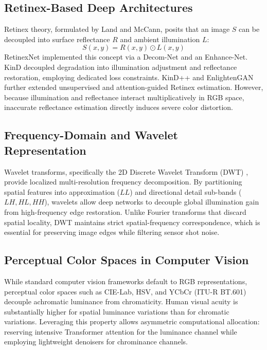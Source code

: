\documentclass[10pt,twocolumn,letterpaper]{article}
\begin{document}
\subsection{Retinex-Based Deep Architectures}
Retinex theory, formulated by Land and McCann, posits that an image $S$ can be decoupled into surface reflectance $R$ and ambient illumination $L$:
\begin{equation}
S(x, y) = R(x, y) \odot L(x, y)
\end{equation}
RetinexNet \cite{wei2018deep} implemented this concept via a Decom-Net and an Enhance-Net. KinD \cite{zhang2019kindling} decoupled degradation into illumination adjustment and reflectance restoration, employing dedicated loss constraints. KinD++ and EnlightenGAN \cite{jiang2021enlightengan} further extended unsupervised and attention-guided Retinex estimation. However, because illumination and reflectance interact multiplicatively in RGB space, inaccurate reflectance estimation directly induces severe color distortion.

\subsection{Frequency-Domain and Wavelet Representation}
Wavelet transforms, specifically the 2D Discrete Wavelet Transform (DWT) \cite{mallat1989theory}, provide localized multi-resolution frequency decomposition. By partitioning spatial features into approximation ($LL$) and directional detail sub-bands ($LH, HL, HH$), wavelets allow deep networks to decouple global illumination gain from high-frequency edge restoration. Unlike Fourier transforms that discard spatial locality, DWT maintains strict spatial-frequency correspondence, which is essential for preserving image edges while filtering sensor shot noise.

\subsection{Perceptual Color Spaces in Computer Vision}
While standard computer vision frameworks default to RGB representations, perceptual color spaces such as CIE-Lab, HSV, and YCbCr (ITU-R BT.601) decouple achromatic luminance from chromaticity. Human visual acuity is substantially higher for spatial luminance variations than for chromatic variations. Leveraging this property allows asymmetric computational allocation: reserving intensive Transformer attention for the luminance channel while employing lightweight denoisers for chrominance channels.
\end{document}
